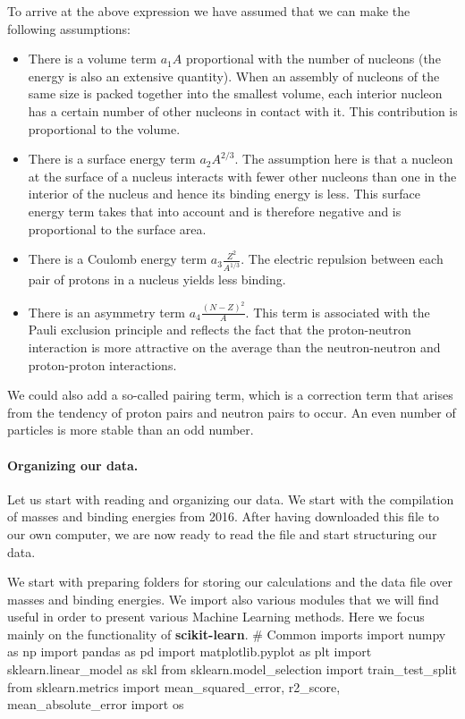\documentclass[%
oneside,                 %
final,                   %
10pt]{article}
\begin{document}
To arrive at the above expression we have assumed that we can make the following assumptions:

\begin{itemize}
 \item There is a volume term $a_1A$ proportional with the number of nucleons (the energy is also an extensive quantity). When an assembly of nucleons of the same size is packed together into the smallest volume, each interior nucleon has a certain number of other nucleons in contact with it. This contribution is proportional to the volume.

 \item There is a surface energy term $a_2A^{2/3}$. The assumption here is that a nucleon at the surface of a nucleus interacts with fewer other nucleons than one in the interior of the nucleus and hence its binding energy is less. This surface energy term takes that into account and is therefore negative and is proportional to the surface area.

 \item There is a Coulomb energy term $a_3\frac{Z^2}{A^{1/3}}$. The electric repulsion between each pair of protons in a nucleus yields less binding. 

 \item There is an asymmetry term $a_4\frac{(N-Z)^2}{A}$. This term is associated with the Pauli exclusion principle and reflects the fact that the proton-neutron interaction is more attractive on the average than the neutron-neutron and proton-proton interactions.
\end{itemize}

\noindent
We could also add a so-called pairing term, which is a correction term that
arises from the tendency of proton pairs and neutron pairs to
occur. An even number of particles is more stable than an odd number. 


\paragraph{Organizing our data.}
Let us start with reading and organizing our data. 
We start with the compilation of masses and binding energies from 2016.
After having downloaded this file to our own computer, we are now ready to read the file and start structuring our data.


We start with preparing folders for storing our calculations and the data file over masses and binding energies. We import also various modules that we will find useful in order to present various Machine Learning methods. Here we focus mainly on the functionality of \textbf{scikit-learn}.
\bpycod
# Common imports
import numpy as np
import pandas as pd
import matplotlib.pyplot as plt
import sklearn.linear_model as skl
from sklearn.model_selection import train_test_split
from sklearn.metrics import mean_squared_error, r2_score, mean_absolute_error
import os
\end{document}
